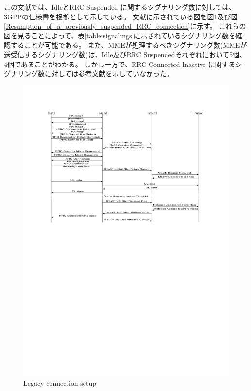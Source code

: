 \documentclass[a4j]{ujarticle}
\begin{document}
この文献\cite{RRCStateHandlingfor5G}では、IdleとRRC Suspended に関するシグナリング数に対しては、3GPPの仕様書\cite{3gpp.23.720}を根拠として示している。
文献\cite{3gpp.23.720}に示されている図を図\ref{Legacy_connection_setup}及び図\ref{Resumption_of_a_previously_suspended_RRC_connection}に示す。
これらの図を見ることによって、表\ref{table:signalings}に示されているシグナリング数を確認することが可能である。
また、MMEが処理するべきシグナリング数(MMEが送受信するシグナリング数)は、Idle及びRRC Suspendedそれぞれにおいて5個、4個であることがわかる。
しかし一方で、RRC Connected Inactive に関するシグナリング数に対しては参考文献を示していなかった。
\begin{figure}[htbp]
  \centering
  \includegraphics[width=0.9\hsize]{Legacy_connection_setup.pdf}
  \caption{Legacy connection setup}
  \label{Legacy_connection_setup}
\end{figure}
\end{document}
